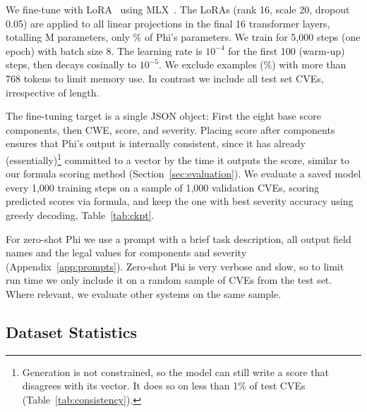 We fine-tune with LoRA~\citep{hu2022lora} using MLX~\citep{hannun2023mlx}.
The LoRAs (rank 16, scale 20, dropout 0.05) are applied to all linear projections in the final 16 transformer layers, totalling \nLoraParams M parameters, only \nLoraPct\% of Phi's parameters.
We train for 5,000 steps (one epoch) with batch size 8.
The learning rate is $10^{-4}$ for the first 100 (warm-up) steps, then decays cosinally to $10^{-5}$.
We exclude \nDropped{} examples (\nDroppedPct\%) with more than 768 tokens to limit memory use.
In contrast we include all test set CVEs, irrespective of length.

The fine-tuning target is a single JSON object: First the eight base score components, then CWE, score, and severity.
Placing score after components ensures that Phi's output is internally consistent, since it has already (essentially)\footnote{Generation is not constrained, so the model can still write a score that disagrees with its vector. It does so on less than 1\% of test CVEs (Table~\ref{tab:consistency}).} committed to a vector by the time it outputs the score, similar to our formula scoring method (Section~\ref{sec:evaluation}).
We evaluate a saved model every 1,000 training steps on a sample of 1,000 validation CVEs, scoring predicted scores via formula, and keep the one with best severity accuracy using greedy decoding, Table~\ref{tab:ckpt}.

For zero-shot Phi we use a prompt with a brief task description, all output field names and the legal values for components and severity (Appendix~\ref{app:prompts}).
Zero-shot Phi is very verbose and slow, so to limit run time we only include it on a random sample of \nSub{} CVEs from the test set.
Where relevant, we evaluate other systems on the same sample.

\FloatBarrier
\subsection{Dataset Statistics}\label{app:stats}


